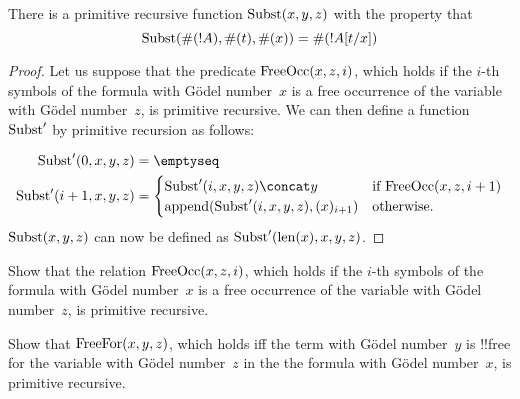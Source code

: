 \documentclass[../../include/open-logic-section]{subfiles}
\begin{document}

\begin{prop}
There is a primitive recursive function $\mathrm{Subst}(x, y, z)$ with the property that
\[
\mathrm{Subst}(\#(!A), \#(t), \#(x)) = \#(!A[t/x])
\]
\end{prop}

\begin{proof}
Let us suppose that the predicate $\mathrm{FreeOcc}(x, z, i)$, which holds
if the $i$-th symbols of the formula with G\"odel number~$x$ is a free
occurrence of the variable with G\"odel number~$z$, is primitive
recursive.  We can then define a function $\mathrm{Subst}'$ by primitive
recursion as follows:

\begin{align*}
\fn{Subst}'(0, x, y, z) & = \emptyseq \\
\fn{Subst}'(i + 1, x, y, z) & =
\begin{cases}
\fn{Subst}'(i, x, y, z) \concat y & \text{if $\fn{FreeOcc}(x, z, i+1)$} \\
\fn{append}(\fn{Subst}'(i, x, y, z), (x)_{i+1}) & \text{otherwise.}
\end{cases}
\end{align*}
$\mathrm{Subst}(x, y, z)$ can now be defined as $\mathrm{Subst}'(\mathrm{len}(x), x, y, z)$.
\end{proof}

\begin{prob}
Show that the relation $\mathrm{FreeOcc}(x, z, i)$, which holds if the
$i$-th symbols of the formula with G\"odel number~$x$ is a free
occurrence of the variable with G\"odel number~$z$, is primitive
recursive.
\end{prob}

\begin{prob}
Show that $\mathrm{FreeFor}(x, y, z)$, which holds iff the term with
G\"odel number~$y$ is !!{free for} the variable with G\"odel
number~$z$ in the the formula with G\"odel number~$x$, is primitive
recursive.
\end{prob}
\end{document}
